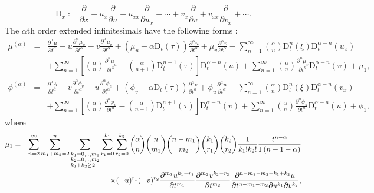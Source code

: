 \documentclass[12pt]{amsart}
\begin{document}
\begin{equation*}
\mathrm{D}_x  :=  \frac{\partial}{\partial x}+u_x\frac{\partial}{\partial u}+u_{xx}\frac{\partial}{\partial u_x}+\cdots
+v_x\frac{\partial}{\partial v}+v_{xx}\frac{\partial}{\partial v_x}+\cdots.
\end{equation*}
The $\alpha$th order extended infinitesimals have the following forms \cite{ourNL}:
\begin{eqnarray}\label{mual2}
\mu^{(\alpha)} & = & \frac{\partial^\alpha\mu}{\partial t^\alpha}-u\frac{\partial^\alpha\mu_u}{\partial t^\alpha}-v\frac{\partial^\alpha\mu_v}{\partial t^\alpha}+\left(\mu_u-\alpha \mathrm{D}_t(\tau)\right)\frac{\partial^\alpha u}{\partial t^\alpha}+\mu_v\frac{\partial^\alpha v}{\partial t^\alpha}-\sum_{n=1}^\infty\binom{\alpha}{n}\mathrm{D}_t^n(\xi)\mathrm{D}_t^{\alpha-n}(u_x)\nonumber\\
& & +\sum_{n=1}^\infty\left[\binom{\alpha}{n}\frac{\partial^n\mu_u}{\partial t^n}-\binom{\alpha}{n+1}\mathrm{D}_t^{n+1}(\tau)\right]\mathrm{D}_t^{\alpha-n}(u)+\sum_{n=1}^\infty\binom{\alpha}{n}\frac{\partial^n\mu_v}{\partial t^n}\mathrm{D}_t^{\alpha-n}(v)+\mu_1,
\end{eqnarray}
\begin{eqnarray}\label{phial}
\phi^{(\alpha)} & = & \frac{\partial^\alpha\phi}{\partial t^\alpha}-v\frac{\partial^\alpha\phi_v}{\partial t^\alpha}-u\frac{\partial^\alpha\phi_u}{\partial t^\alpha}+(\phi_v-\alpha \mathrm{D}_t(\tau))\frac{\partial^\alpha v}{\partial t^\alpha}+\phi_u\frac{\partial^\alpha u}{\partial t^\alpha}-\sum_{n=1}^\infty\binom{\alpha}{n}\mathrm{D}_t^n(\xi)\mathrm{D}_t^{\alpha-n}(v_x)\nonumber\\
& & +\sum_{n=1}^\infty\left[\binom{\alpha}{n}\frac{\partial^n\phi_v}{\partial t^n}-\binom{\alpha}{n+1}\mathrm{D}_t^{n+1}(\tau)\right]\mathrm{D}_t^{\alpha-n}(v)+\sum_{n=1}^\infty\binom{\alpha}{n}\frac{\partial^n\phi_u}{\partial t^n}\mathrm{D}_t^{\alpha-n}(u)+\phi_1,
\end{eqnarray}
where
\begin{eqnarray*}
\mu_1 & = & \sum_{n=2}^\infty\sum_{m_1+m_2=2}^n\sum_{\begin{subarray}
~k_1=0,..,m_1\\
k_2=0,..,m_2\\
k_1+k_2\geq 2
\end{subarray}}\sum_{r_1=0}^{k_1}\sum_{r_2=0}^{k_2}\binom{\alpha}{n}\binom{n}{m_1}\binom{n-m_1}{m_2}\binom{k_1}{r_1}\binom{k_2}{r_2} \frac{1}{k_1!k_2!}\frac{t^{n-\alpha}}{\Gamma(n+1-\alpha)}\\
&&\times(-u)^{r_1}(-v)^{r_2}\frac{\partial^{m_1}u^{k_1-r_1}}{\partial t^{m_1}}\frac{\partial^{m_2}v^{k_2-r_2}}{\partial t^{m_2}} \frac{\partial^{n-m_1-m_2+k_1+k_2}\mu}{\partial t^{n-m_1-m_2}\partial u^{k_1}\partial v^{k_2}},\nonumber
\end{eqnarray*}
\end{document}
